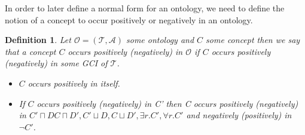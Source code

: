 \documentclass[titlepage]{article}
\newtheorem{definition}{Definition}
\begin{document}
In order to later define a normal form for an ontology, we need to define the notion of a concept
to occur positively or negatively in an ontology.
\begin{definition}
  Let $\mathcal{O} = (\mathcal{T}, \mathcal{A})$ some ontology and $C$ some concept then we say that a concept $C$ occurs positively (negatively) in $\mathcal{O}$ if
  $C$ occurs positively (negatively) in some GCI of $\mathcal{T}$. \\
  \begin{itemize}
    \item $C$ occurs positively in itself.
    \item If $C$ occurs positively (negatively) in C' then C occurs positively (negatively) in
    $C' \sqcap D C \sqcap D', C' \sqcup D, C \sqcup D', \exists r.C', \forall r.C'$ 
    and negatively (positively) in $\neg C'$.
  \end{itemize}
  



  
\end{definition}
\end{document}
